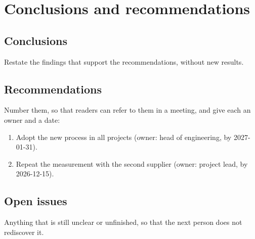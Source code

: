 \chapter{Conclusions and recommendations}
\label{ch:conclusions}

\section{Conclusions}
Restate the findings that support the recommendations, without new results.

\section{Recommendations}
Number them, so that readers can refer to them in a meeting, and give each an owner and a date:
\begin{enumerate}
  \item Adopt the new process in all projects (owner: head of engineering, by 2027-01-31).
  \item Repeat the measurement with the second supplier (owner: project lead, by 2026-12-15).
\end{enumerate}

\section{Open issues}
Anything that is still unclear or unfinished, so that the next person does not rediscover it.
